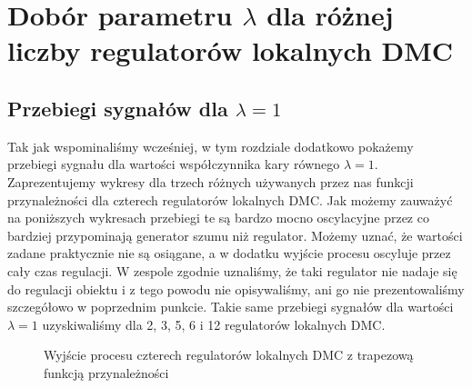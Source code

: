 \section{Dobór parametru $\lambda$ dla różnej liczby regulatorów lokalnych DMC}
\label{pro_zad7_opis}

\subsection{Przebiegi sygnałów dla $\lambda = 1$}
Tak jak wspominaliśmy wcześniej, w tym rozdziale dodatkowo pokażemy przebiegi sygnału dla wartości współczynnika kary równego $\lambda = 1$. Zaprezentujemy wykresy dla trzech różnych używanych przez nas funkcji przynależności dla czterech regulatorów lokalnych DMC. Jak możemy zauważyć na poniższych wykresach przebiegi te są bardzo mocno oscylacyjne przez co bardziej przypominają generator szumu niż regulator. Możemy uznać, że wartości zadane praktycznie nie są osiągane, a w dodatku wyjście procesu oscyluje przez cały czas regulacji. W zespole zgodnie uznaliśmy, że taki regulator nie nadaje się do regulacji obiektu i z tego powodu nie opisywaliśmy, ani go nie prezentowaliśmy szczegółowo w poprzednim punkcie. Takie same przebiegi sygnałów dla wartości $\lambda = 1$ uzyskiwaliśmy dla 2, 3, 5, 6 i 12 regulatorów lokalnych DMC. 
\begin{figure}[h]
    \centering
    \caption{Wyjście procesu czterech regulatorów lokalnych DMC z trapezową funkcją przynależności}
    \label{pro_zad7_DMC_trapezoid_4_out}
\end{figure}

